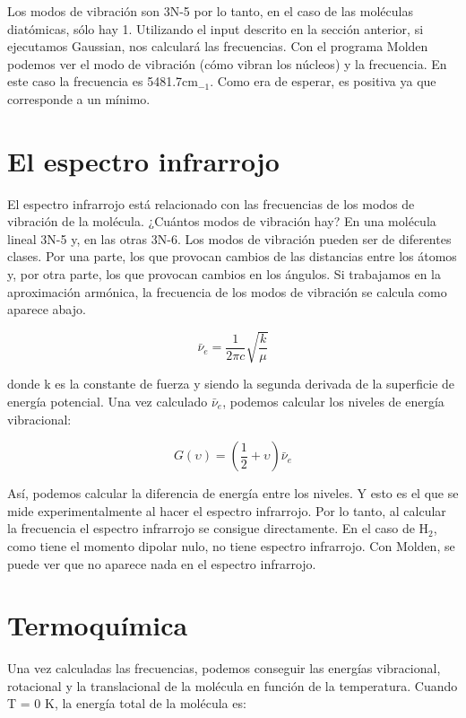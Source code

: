 \documentclass{tufte-book}
\begin{document}
Los modos de vibración son 3N-5 por lo tanto, en el caso de las  moléculas diatómicas, sólo hay 1. Utilizando el input descrito en la sección anterior, si ejecutamos Gaussian, nos calculará las frecuencias. Con el programa Molden podemos ver el modo de vibración (cómo vibran los núcleos) y la frecuencia. En este caso la frecuencia es 5481.7cm$_{-1}$. Como era de esperar, es positiva ya que corresponde a un mínimo.


\section{El espectro infrarrojo}

El espectro infrarrojo está relacionado con las frecuencias de los modos de vibración de la molécula. ¿Cuántos modos de vibración hay? En una molécula lineal 3N-5 y, en las otras 3N-6. Los modos de vibración pueden ser de diferentes clases. Por una parte, los que provocan cambios de las distancias entre los átomos y, por otra parte, los que provocan cambios en los ángulos. Si trabajamos en la aproximación armónica, la frecuencia de los modos de vibración se calcula como aparece abajo. 

\begin{equation}
    \bar{\nu}_e = \frac{1}{2\pi c}\sqrt{\frac{k}{\mu}}
\end{equation}

donde k es la constante de fuerza y siendo la segunda derivada de la superficie de energía potencial. Una vez calculado $\bar{\nu}_e$, podemos calcular los niveles de energía vibracional:

\begin{equation}
    G(\upsilon) = \left(\frac{1}{2}+\upsilon\right)\bar{\nu}_e
\end{equation}

Así, podemos calcular la diferencia de energía entre los niveles. Y esto es el que se mide experimentalmente al hacer el espectro infrarrojo. Por lo tanto, al calcular la frecuencia el espectro infrarrojo se consigue directamente. En el caso de H$_2$, como tiene el momento dipolar nulo, no tiene espectro infrarrojo. Con Molden, se puede ver que no aparece nada en el espectro infrarrojo.


\section{Termoquímica}

Una vez calculadas las frecuencias, podemos conseguir las energías vibracional, rotacional y la translacional de la molécula en función de la temperatura. Cuando T = 0 K, la energía total de la molécula es:
\end{document}
